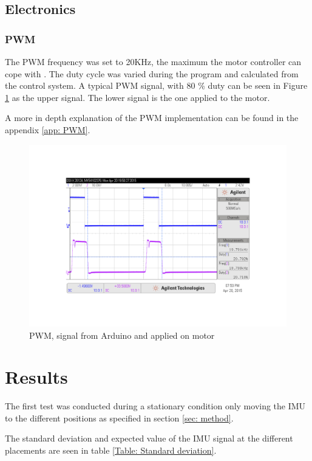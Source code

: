 \documentclass[a4paper,11pt]{kth-mag}
\begin{document}
\section{Electronics}



\subsection{PWM}
The PWM frequency was set to 20KHz, the maximum the motor controller can cope with \cite{MC33926}. The duty cycle was varied during the program and calculated from the control system. A typical PWM signal, with 80 \%  duty can be seen in Figure \ref{Fig: PWMscope} as the upper signal. The lower signal is the one applied to the motor.

A more in depth explanation of the PWM implementation can be found in the appendix \ref{app: PWM}.
\begin{figure}[!hbt]
\centering
\includegraphics[trim=5cm 5.5cm 5cm 5cm, clip=true,scale=0.15]{PWMpic1.jpg}
\caption{PWM, signal from Arduino and applied on motor}
\label{Fig: PWMscope}
\end{figure} 


\chapter{Results}
The first test was conducted during a stationary condition only moving the IMU to the different positions as specified in section \ref{sec: method}.

The standard deviation and expected value of the IMU signal at the different placements are seen in table \ref{Table: Standard deviation}.
\end{document}
